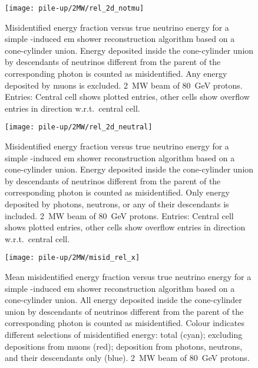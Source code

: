\begin{figure}[tbp]
	\centering
	\texttt{[image: pile-up/2MW/rel\_2d\_notmu]}
	\caption[Pile-up study misidentified fractional vs.\ true neutrino energy, no muons, \SI{2}{\mega\watt} beam]{%
		Misidentified energy fraction versus true neutrino energy for a simple \Pgpz-induced \acrshort{em} shower reconstruction algorithm based on a cone-cylinder union.
		Energy deposited inside the cone-cylinder union by descendants of neutrinos different from the parent of the corresponding \Pgpz photon is counted as misidentified.
		Any energy deposited by muons is excluded.
		\SI{2}{\mega\watt} beam of \SI{80}{\giga\electronvolt} protons.
		Entries: Central cell shows plotted entries, other cells show overflow entries in direction w.r.t.\ central cell.
	}
\end{figure}

\begin{figure}[tbp]
	\centering
	\texttt{[image: pile-up/2MW/rel\_2d\_neutral]}
	\caption[Pile-up study misidentified fractional vs.\ true neutrino energy, only neutrals, \SI{2}{\mega\watt} beam]{%
		Misidentified energy fraction versus true neutrino energy for a simple \Pgpz-induced \acrshort{em} shower reconstruction algorithm based on a cone-cylinder union.
		Energy deposited inside the cone-cylinder union by descendants of neutrinos different from the parent of the corresponding \Pgpz photon is counted as misidentified.
		Only energy deposited by photons, neutrons, or any of their descendants is included.
		\SI{2}{\mega\watt} beam of \SI{80}{\giga\electronvolt} protons.
		Entries: Central cell shows plotted entries, other cells show overflow entries in direction w.r.t.\ central cell.
	}
\end{figure}

\begin{figure}[tbp]
	\centering
	\texttt{[image: pile-up/2MW/misid\_rel\_x]}
	\caption[Pile-up study mean misidentified fractional vs.\ true neutrino energy, \SI{2}{\mega\watt} beam]{%
		Mean misidentified energy fraction versus true neutrino energy for a simple \Pgpz-induced \acrshort{em} shower reconstruction algorithm based on a cone-cylinder union.
		All energy deposited inside the cone-cylinder union by descendants of neutrinos different from the parent of the corresponding \Pgpz photon is counted as misidentified.
		Colour indicates different selections of misidentified energy: total (cyan); excluding depositions from muons (red); deposition from photons, neutrons, and their descendants only (blue).
		\SI{2}{\mega\watt} beam of \SI{80}{\giga\electronvolt} protons.
	}
\end{figure}

